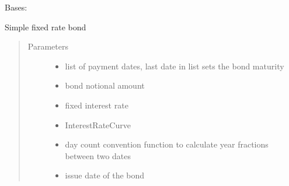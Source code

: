 \documentclass[a4paper,10pt,english]{sphinxmanual}
\begin{document}
\begin{fulllineitems}
\label{\detokenize{api/Derivate:Derivate.session1_exercise3.BondCashFlowLegList}}
\sphinxAtStartPar
Bases: 

\sphinxAtStartPar
Simple fixed rate bond
\begin{quote}\begin{description}
\item[{Parameters}] \leavevmode\begin{itemize}
\item {} 
\sphinxAtStartPar
{} \textendash{} list of payment dates,
last date in list sets the bond maturity

\item {} 
\sphinxAtStartPar
{} \textendash{} bond notional amount

\item {} 
\sphinxAtStartPar
{} \textendash{} fixed interest rate

\item {} 
\sphinxAtStartPar
{} \textendash{} InterestRateCurve

\item {} 
\sphinxAtStartPar
{} \textendash{} day count convention function
to calculate year fractions between two dates

\item {} 
\sphinxAtStartPar
{} \textendash{} issue date of the bond

\end{itemize}

\end{description}\end{quote}


\end{fulllineitems}
\end{document}
